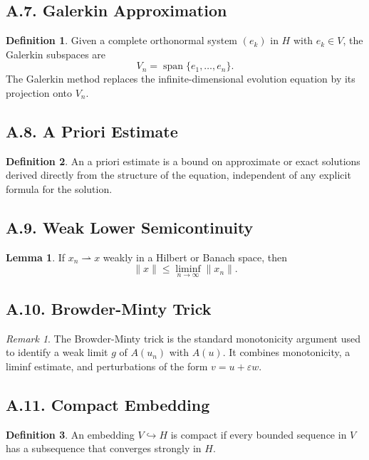 \documentclass[11pt]{article}
\theoremstyle{definition}
\newtheorem{definition}{Definition}
\newtheorem{lemma}{Lemma}
\theoremstyle{remark}
\newtheorem{remark}{Remark}
\begin{document}
\subsection*{A.7. Galerkin Approximation}
\begin{definition}
Given a complete orthonormal system \((e_k)\) in \(H\) with \(e_k\in V\), the Galerkin subspaces are
\[
V_n=\operatorname{span}\{e_1,\dots,e_n\}.
\]
The Galerkin method replaces the infinite-dimensional evolution equation by its projection onto \(V_n\).
\end{definition}

\subsection*{A.8. A Priori Estimate}
\begin{definition}
An a priori estimate is a bound on approximate or exact solutions derived directly from the structure of the equation, independent of any explicit formula for the solution.
\end{definition}

\subsection*{A.9. Weak Lower Semicontinuity}
\begin{lemma}
If \(x_n\rightharpoonup x\) weakly in a Hilbert or Banach space, then
\[
\|x\|\le \liminf_{n\to\infty}\|x_n\|.
\]
\end{lemma}

\subsection*{A.10. Browder-Minty Trick}
\begin{remark}
The Browder-Minty trick is the standard monotonicity argument used to identify a weak limit \(g\) of \(A(u_n)\) with \(A(u)\). It combines monotonicity, a liminf estimate, and perturbations of the form \(v=u+\varepsilon w\).
\end{remark}

\subsection*{A.11. Compact Embedding}
\begin{definition}
An embedding \(V\hookrightarrow H\) is compact if every bounded sequence in \(V\) has a subsequence that converges strongly in \(H\).
\end{definition}
\end{document}
